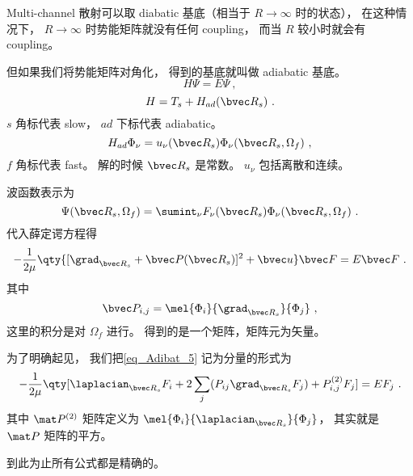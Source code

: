 
\begin{issues}
\issueDraft
\end{issues}


Multi-channel 散射可以取 diabatic 基底（相当于 $R\to \infty$ 时的状态）， 在这种情况下， $R\to\infty$ 时势能矩阵就没有任何 coupling， 而当 $R$ 较小时就会有 coupling。

但如果我们将势能矩阵对角化， 得到的基底就叫做 adiabatic 基底。
\begin{equation}
H \Psi = E \Psi~,
\end{equation}
\begin{equation}
H = T_s + H_{ad}(\bvec R_s)~.
\end{equation}
$s$ 角标代表 slow， $ad$ 下标代表 adiabatic。
\begin{equation}
H_{ad} \Phi_\nu = u_\nu (\bvec R_s) \Phi_\nu (\bvec R_s, \Omega_f)~,
\end{equation}
$f$ 角标代表 fast。 解的时候 $\bvec R_s$ 是常数。 $u_\nu$ 包括离散和连续。

波函数表示为
\begin{equation}
\Psi(\bvec R_s, \Omega_f) = \sumint_\nu F_\nu (\bvec R_s) \Phi_\nu(\bvec R_s, \Omega_f)~.
\end{equation}
代入薛定谔方程得
\begin{equation}\label{eq_Adibat_5}
-\frac{1}{2\mu} \qty{[\grad_{\bvec R_s} + \bvec P(\bvec R_s)]^2 + \bvec u} \bvec F = E \bvec F~.
\end{equation}
其中
\begin{equation}
\bvec P_{i,j} = \mel{\Phi_i}{\grad_{\bvec R_s}}{\Phi_j}~,
\end{equation}
这里的积分是对 $\Omega_f$ 进行。 得到的是一个矩阵，矩阵元为矢量。

为了明确起见， 我们把\autoref{eq_Adibat_5} 记为分量的形式为
\begin{equation}
-\frac{1}{2\mu} \qty[\laplacian_{\bvec R_s} F_i + 2\sum_j ( P_{ij} \grad_{\bvec R_s} F_j) + P_{i,j}^{(2)} F_j] = E F_j~.
\end{equation}
其中 $\mat P^{(2)}$ 矩阵定义为 $\mel{\Phi_i}{\laplacian_{\bvec R_s}}{\Phi_j}$， 其实就是 $\mat P$ 矩阵的平方。

到此为止所有公式都是精确的。
